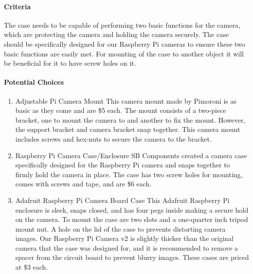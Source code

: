 \paragraph{Criteria}

The case needs to be capable of performing two basic functions for the camera, which 
are protecting the camera and holding the camera securely. The case should be specifically 
designed for our Raspberry Pi cameras to ensure these two basic functions are easily 
met. For mounting of the case to another object it will be beneficial for it to 
have screw holes on it. \\

\paragraph{Potential Choices}
	\begin{enumerate}
		\item{Adjustable Pi Camera Mount}
			This camera mount made by Pimoroni is as basic as they come and are \$5 each. The mount 
			consists of a two-piece bracket, one to mount the camera to and another to fix the 
			mount. However, the support bracket and camera bracket snap together. This camera 
			mount includes screws and hex-nuts to secure the camera to the bracket\cite{AdjCamMt}. \\

		\item{Raspberry Pi Camera Case/Enclosure}
			SB Components created a camera case specifically designed for the Raspberry Pi camera 
			and snaps together to firmly hold the camera in place. The case has two screw holes for 
			mounting, comes with screws and tape, and are \$6 each\cite{BlueCase}. \\

		\item{Adafruit Raspberry Pi Camera Board Case}
			This Adafruit Raspberry Pi enclosure is sleek, snaps closed, and has four pegs inside making a 
			secure hold on the camera. To mount the case are two slots and a 
			one-quarter inch tripod mount nut. A hole on the lid of the case to prevents 
			distorting camera images. Our Raspberry Pi Camera v2 is slightly thicker than the 
			original camera that the case was designed for, and it is recommended to remove a spacer from 
			the circuit board to prevent blurry images. These cases are priced at \$3 each\cite{adafruitCase}.\\
	\end{enumerate}

